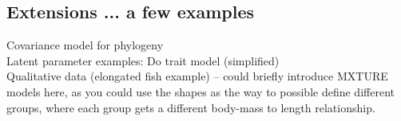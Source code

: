 \documentclass[11pt]{article}
\begin{document}


\subsection{Extensions ... a few examples}

Covariance model for phylogeny\\
Latent parameter examples: Do trait model (simplified)\\
Qualitative data (elongated fish example) -- could briefly introduce MXTURE models here, as you could use the shapes as the way to possible define different groups, where each group gets a different body-mass to length relationship. 
\end{document}
